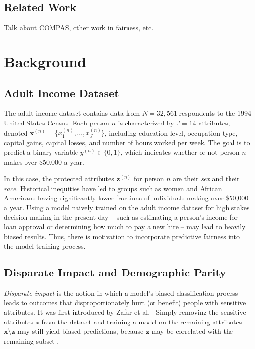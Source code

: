 \documentclass{article}
\newcommand{\bd}[1]{\boldsymbol{#1}}
\newcommand{\idx}[3][]{{#2}^{(#3)}_{#1}}
\newcommand{\bidx}[3][]{\bd{#2}^{(#3)}_{#1}}
\begin{document}
\subsection{Related Work}
Talk about COMPAS, other work in fairness, etc.

\section{Background}

\subsection{Adult Income Dataset}

The adult income dataset \citep{kohavi1996scaling} contains data from $N = 32,561$ respondents to the 1994 United States Census.  Each person $n$ is characterized by $J = 14$ attributes, denoted $\bidx x n = \{\idx[1] x n, \ldots, \idx[J] x n\}$, including education level, occupation type, capital gains, capital losses, and number of hours worked per week.  The goal is to predict a binary variable $\idx y n \in \{0, 1\}$, which indicates whether or not person $n$ makes over \$50,000 a year.

In this case, the protected attributes $\bidx z n$ for person $n$ are their \emph{sex} and their \emph{race}.  Historical inequities have led to groups such as women and African Americans having significantly lower fractions of individuals making over \$50,000 a year.  Using a model naively trained on the adult income dataset for high stakes decision making in the present day -- such as estimating a person's income for loan approval or determining how much to pay a new hire -- may lead to heavily biased results.  Thus, there is motivation to incorporate predictive fairness into the model training process.

\subsection{Disparate Impact and Demographic Parity}   

\emph{Disparate impact} is the notion in which a model's biased classification process leads to outcomes that disproportionately hurt (or benefit) people with sensitive attributes.  It was first introduced by Zafar et al.  .  Simply removing the sensitive attributes $\bd z$ from the dataset and training a model on the remaining attributes $\bd x \setminus \bd z$ may still yield biased predictions, because $\bd z$ may be correlated with the remaining subset \citep{agarwal2018reductions}.
\end{document}

